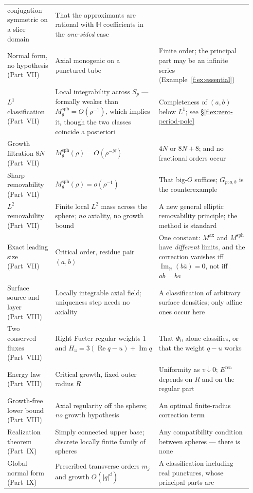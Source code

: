 \documentclass[11pt,a4paper]{article}
\numberwithin{equation}{section}
\theoremstyle{definition}
\theoremstyle{remark}
\theoremstyle{plain}
\newcommand{\HH}{\mathbb H}
\DeclareMathOperator{\Rea}{Re}
\DeclareMathOperator{\Ima}{Im}
\newcommand{\ImH}{\Ima_{\HH}}
\newcommand{\Sp}{S_{p}}
\newcommand{\Msph}{M^{\mathrm{sph}}}                  %
\newcommand{\Max}{M^{\mathrm{ax}}}                    %
\newcommand{\Eren}{E^{\mathrm{ren}}}
\newcommand{\abs}[1]{\lvert #1\rvert}
\begin{document}
{\begin{longtable}{@{}p{}p{}p{}@{}}
conjugation-symmetric on a slice domain &
That the approximants are rational with $\HH$ coefficients in the
\emph{one-sided} case\\
Normal form, no hypothesis (Part~VII) &
Axial monogenic on a punctured tube &
Finite order; the principal part may be an infinite series
(Example~\ref{f:ex:essential})\\
$L^1$ classification (Part~VII) &
Local integrability across $\Sp$ --- formally weaker than
$\Msph_g=O(\rho^{-1})$, which implies it, though the two classes coincide
a posteriori &
Completeness of $(a,b)$ below $L^1$; see
\S\ref{f:ex:zero-period-pole}\\
Growth filtration $8N$ (Part~VII) &
$\Msph_g(\rho)=O(\rho^{-N})$ &
$4N$ or $8N+8$; and no fractional orders occur\\
Sharp removability (Part~VII) &
$\Msph_g(\rho)=o(\rho^{-1})$ &
That big-$O$ suffices; $G_{p;a,b}$ is the counterexample\\
$L^2$ removability (Part~VII) &
Finite local $L^2$ mass across the sphere; \emph{no} axiality, no growth
bound &
A new general elliptic removability principle; the method is standard\\
Exact leading size (Part~VII) &
Critical order, residue pair $(a,b)$ &
One constant: $\Max$ and $\Msph$ have \emph{different} limits, and the
correction vanishes iff $\ImH(b\bar a)=0$, not iff $ab=ba$\\
Surface source and layer (Part~VIII) &
Locally integrable axial field; uniqueness step needs no axiality &
A classification of arbitrary surface densities; only affine ones occur
here\\
Two conserved fluxes (Part~VIII) &
Right-Fueter-regular weights $1$ and
$H_u=3(\Rea q-u)+\Ima q$ &
That $\Phi_0$ alone classifies, or that the weight $q-u$ works\\
Energy law (Part~VIII) &
Critical growth, fixed outer radius $R$ &
Uniformity as $v\downarrow0$; $\Eren$ depends on $R$ and on the regular part\\
Growth-free lower bound (Part~VIII) &
Axial regularity off the sphere; \emph{no} growth hypothesis &
An optimal finite-radius correction term\\
Realization theorem (Part~IX) &
Simply connected upper base; discrete locally finite family of spheres &
Any compatibility condition between spheres --- there is none\\
Global normal form (Part~IX) &
Prescribed transverse orders $m_j$ and growth $O(\abs q^{d})$ &
A classification including real punctures, whose principal parts are

\end{longtable}}
\end{document}
